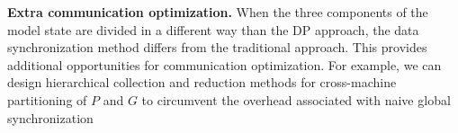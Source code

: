 
\noindent\textbf{Extra communication optimization.}
When the three components of the model state are divided in a different way than the DP approach, the data synchronization method differs from the traditional approach. This provides additional opportunities for communication optimization. For example, we can design hierarchical collection and reduction methods for cross-machine partitioning of $P$ and $G$ to circumvent the overhead associated with naive global synchronization

